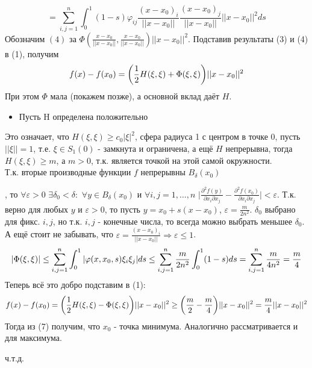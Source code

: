 \documentclass[book, 11pt]{report}
\begin{document}
{\begin{equation*}
    \end{equation*}
    \begin{equation}
        =\sum_{i,j=1}^n\int_0^1(1-s)\varphi_{ij}\frac{(x-x_0)_i}{||x-x_0||}\frac{(x-x_0)_j}{||x-x_0||}||x-x_0||^2ds        
    \end{equation}
    Обозначим $(4)$ за $\Phi(\frac{x-x_0}{||x-x_0||}, \frac{x-x_0}{||x-x_0||})||x-x_0||^2$. Подставив результаты (3) и (4) в (1), получим
	\begin{equation}
		f(x)-f(x_0)=\bigg({1\over2}H(\xi,\xi)+\Phi(\xi,\xi)\bigg)||x-x_0||^2
	\end{equation}
	При этом $\Phi$ мала (покажем позже), а основной вклад даёт $H$.\\
    \begin{itemize}
        \item Пусть H определена положительно
    \end{itemize}
    Это означает, что $H(\xi,\xi)\geq c_0|\xi|^2$, сфера радиуса 1 с центром в точке 0, пусть $||\xi||=1$, т.е. $\xi\in S_1(0)$ - замкнута и ограничена, а ещё $H$ непрерывна, тогда $H(\xi,\xi)\geq m$, а $m>0$, т.к. является точкой на этой самой окружности.\\
    Т.к. вторые производные функции $f$ непрерывны $B_\delta(x_0)$
    }, то $\forall\varepsilon>0$ $\exists\delta_0<\delta:$ $\forall y\in B_\delta(x_0)$ и $\forall i,j=1,\ldots, n$ $\displaystyle\bigg|\frac{\partial^2f(y)}{\partial x_i\partial x_j}-\frac{\partial^2f(x_0)}{\partial x_i\partial x_j}\bigg|<\varepsilon$.
    Т.к. верно для любых $y$ и $\varepsilon>0$, то пусть $y=x_0+s(x-x_0)$, $\varepsilon=\frac{m}{2n^2}$. $\delta_0$ выбрано для фикс. $i,j$, но т.к. $i,j$ - конечные числа, то всегда можно выбрать меньшее $\delta_0$. \\
    А ещё стоит не забывать, что $\varepsilon=\frac{(x-x_0)_i}{||x-x_0||}\Rightarrow\varepsilon\leq1$.
    \begin{equation}    |\Phi(\xi,\xi)|\leq\sum_{i,j=1}^n\int_0^1|\varphi(x,x_0,s)\xi_i\xi_j|ds\leq\sum_{i,j=1}^n\frac{m}{2n^2}\int_0^1(1-s)ds=\sum_{i,j=1}^n\frac{m}{4n^2}={m\over4}
    \end{equation}
    Теперь всё это добро подставим в (1):
    \begin{equation}
        f(x)-f(x_0)=\bigg({1\over2}H(\xi,\xi)-\Phi(\xi,\xi)\bigg)||x-x_0||^2\geq\bigg({m\over2}-{m\over4}\bigg)||x-x_0||^2={m\over4}||x-x_0||^2
    \end{equation}
    Тогда из (7) получим, что $x_0$ - точка минимума. Аналогично рассматривается и для максимума.
    \par{{\raggedleft ч.т.д.\par}}
    \vspace{0.5cm}
\end{document}
